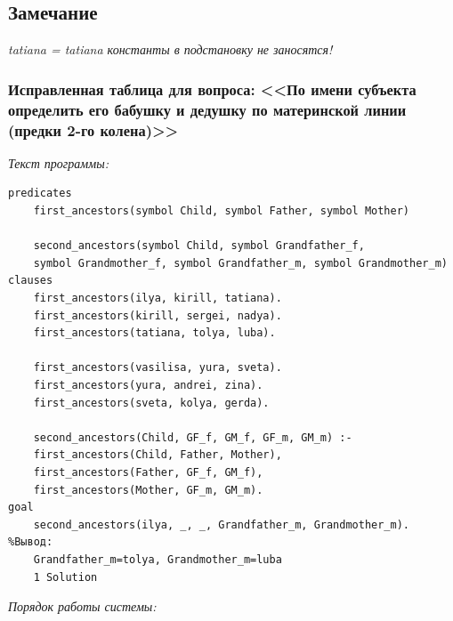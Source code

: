 \documentclass[a4paper,12pt]{article}
\begin{document}
	\subsection*{Замечание}
	
	\textit{tatiana = tatiana  константы в подстановку не заносятся!}
		
	\subsubsection*{Исправленная таблица для вопроса: <<По имени субъекта определить его бабушку и дедушку по материнской линии (предки 2-го колена)>>}
	
	\textit{Текст программы:}
	
	\begin{verbatim}
predicates
	first_ancestors(symbol Child, symbol Father, symbol Mother)
	
	second_ancestors(symbol Child, symbol Grandfather_f, 
	symbol Grandmother_f, symbol Grandfather_m, symbol Grandmother_m)
clauses
	first_ancestors(ilya, kirill, tatiana).
	first_ancestors(kirill, sergei, nadya).
	first_ancestors(tatiana, tolya, luba).
	
	first_ancestors(vasilisa, yura, sveta).
	first_ancestors(yura, andrei, zina).
	first_ancestors(sveta, kolya, gerda).
	
	second_ancestors(Child, GF_f, GM_f, GF_m, GM_m) :- 
	first_ancestors(Child, Father, Mother),
	first_ancestors(Father, GF_f, GM_f), 
	first_ancestors(Mother, GF_m, GM_m).
goal
	second_ancestors(ilya, _, _, Grandfather_m, Grandmother_m).
%Вывод:
	Grandfather_m=tolya, Grandmother_m=luba
	1 Solution
	\end{verbatim}
	
	\textit{Порядок работы системы:}
	
\end{document}
